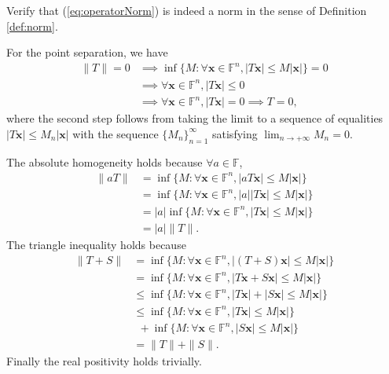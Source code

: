 \begin{exc}
  Verify that (\ref{eq:operatorNorm})
  is indeed a norm in the sense of Definition \ref{def:norm}.
\end{exc}
\begin{solution}
  For the point separation, we have
  \begin{displaymath}
    \begin{array}{rl}
    \|T\| = 0 & \implies \inf\{M: \forall \mathbf{x} \in
                \mathbb{F}^n, |T\mathbf{x}| \leq M|\mathbf{x}|\} =0
      \\ &\implies \forall \mathbf{x} \in \mathbb{F}^n,
           |T\mathbf{x}| \leq 0
      \\ &\implies \forall \mathbf{x} \in \mathbb{F}^n, |T\mathbf{x}| = 0 \implies T = 0,
    \end{array}
  \end{displaymath}
  where the second step follows from
  taking the limit to a sequence of equalities
  $|T\mathbf{x}|\le M_n |\mathbf{x}|$
  with the sequence $\{M_n\}_{n=1}^{\infty}$
  satisfying $\lim_{n\rightarrow +\infty} M_n = 0$.

  The absolute homogeneity holds because $\forall a \in \mathbb{F}$, 
  \begin{displaymath}
    \begin{array}{rl}
      \|aT\| &= \inf\{M:\forall \mathbf{x} \in \mathbb{F}^n,|aT
               \mathbf{x} | \leq M|\mathbf{x}|\}
      \\ &= \inf\{M:\forall \mathbf{x} \in
           \mathbb{F}^n,|a||T\mathbf{x}| \leq M|\mathbf{x}|\}
      \\ &= |a|\inf\{M:\forall \mathbf{x} \in
           \mathbb{F}^n,|T\mathbf{x}| \leq M|\mathbf{x}|\}
      \\ &= |a|\|T\|.
    \end{array}
  \end{displaymath}
  The triangle inequality holds because
  \begin{displaymath}
    \begin{array}{rl}
      \|T + S\| &= \inf\{M: \forall \mathbf{x} \in \mathbb{F}^n,
                  |(T+S)\mathbf{x}| \leq M|\mathbf{x}|\}\\
      &= \inf\{M:\forall \mathbf{x} \in \mathbb{F}^n, |T\mathbf{x}+S\mathbf{x}| \leq M|\mathbf{x}|\} \\
      &\leq \inf\{M:\forall \mathbf{x} \in \mathbb{F}^n, |T\mathbf{x}|+|S\mathbf{x}| \leq M|\mathbf{x}|\}\\
      &\leq \inf\{M:\forall \mathbf{x} \in \mathbb{F}^n,
        |T\mathbf{x}| \leq M|\mathbf{x}|\} \\
      &\ \  + \inf\{M:\forall \mathbf{x} \in \mathbb{F}^n, |S\mathbf{x}| \leq M|\mathbf{x}|\}\\
      &= \|T\| + \|S\|.
    \end{array}
  \end{displaymath}
  Finally the real positivity holds trivially.
\end{solution}

